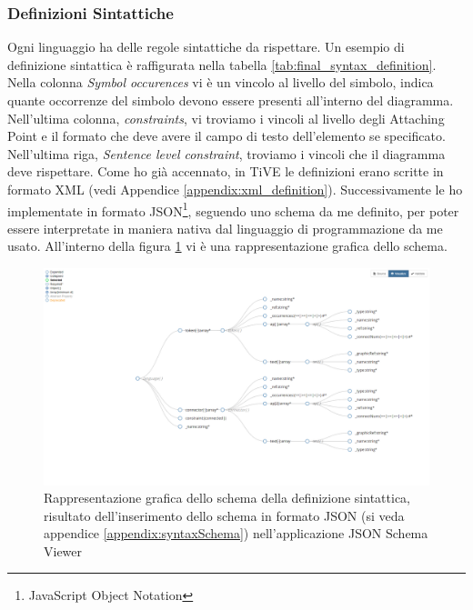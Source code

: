            \subsubsection{Definizioni Sintattiche}
                Ogni linguaggio ha delle regole sintattiche da rispettare. Un esempio di definizione sintattica è raffigurata nella tabella \ref{tab:final_syntax_definition}. Nella colonna \textit{Symbol occurences} vi è un vincolo al livello del simbolo, indica quante occorrenze del simbolo devono essere presenti all'interno del diagramma. Nell'ultima colonna, \textit{constraints}, vi troviamo i vincoli al livello degli Attaching Point e il formato che deve avere il campo di testo dell'elemento se specificato. Nell'ultima riga, \textit{Sentence level constraint}, troviamo i vincoli che il diagramma deve rispettare.
                \newline
                Come ho già accennato, in TiVE le definizioni erano scritte in formato XML (vedi Appendice \ref{appendix:xml_definition}). Successivamente le ho implementate in formato JSON\footnote{JavaScript Object Notation}, seguendo uno schema da me definito, per poter essere interpretate in maniera nativa dal linguaggio di programmazione da me usato. All'interno della figura \ref{fig:syntaxSchema} vi è una rappresentazione grafica dello schema.

                \begin{figure}[]
                    \centering
                    \includegraphics[scale=0.45,angle=90,origin=c]{Figure/schema/syntaxSchema.PNG}
                    \caption{Rappresentazione grafica dello schema della definizione sintattica, risultato dell'inserimento dello schema in formato JSON (si veda appendice \ref{appendix:syntaxSchema}) nell'applicazione JSON Schema Viewer \cite{jsonschema}}
                    \label{fig:syntaxSchema}
                \end{figure}
                \newpage

